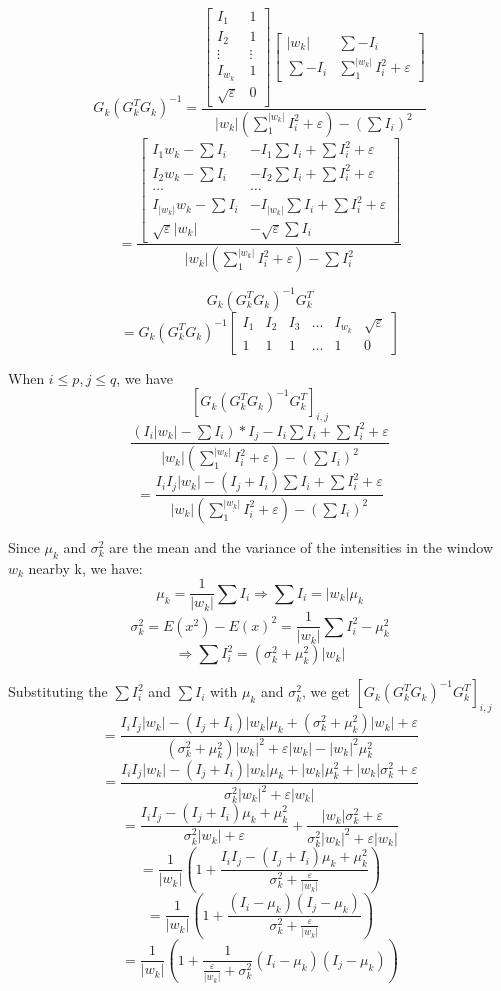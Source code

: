 \documentclass[11pt,letterpaper]{article}
\begin{document}
$$G_k(G_k^TG_k)^{-1} = \frac{\begin{bmatrix}
    I_1 & 1 \\ I_2 & 1 \\ \vdots & \vdots \\ I_{w_k} & 1 \\ \sqrt{\varepsilon} & 0 
  \end{bmatrix} 
  \begin{bmatrix}
    |w_k| & \sum -I_i \\
    \sum -I_i & \sum_{1}^{|w_k|} I_i^2 + \varepsilon
  \end{bmatrix}}{|w_k|(\sum_{1}^{|w_k|} I_i^2 + \varepsilon) - (\sum I_i)^2} $$
$$ = \frac{\begin{bmatrix}
    I_1w_k - \sum I_i & -I_1 \sum I_i + \sum I_i^2 + \varepsilon \\
    I_2w_k - \sum I_i & -I_2 \sum I_i + \sum I_i^2 + \varepsilon \\
    \hdots & \hdots \\
    I_{|w_k|}w_k - \sum I_i & -I_{|w_k|} \sum I_i + \sum I_i^2 + \varepsilon \\
    \sqrt{\varepsilon}|w_k| & -\sqrt{\varepsilon}\sum I_i
  \end{bmatrix}}{|w_k|(\sum_{1}^{|w_k|} I_i^2 + \varepsilon) - \sum I_i^2}$$

$$G_k(G_k^TG_k)^{-1}G_k^T $$
$$= G_k(G_k^TG_k)^{-1}
  \begin{bmatrix}
    I_1 & I_2 & I_3 & ... & I_{w_k} & \sqrt{\varepsilon}\\
    1 & 1 & 1 & ... & 1 & 0 
  \end{bmatrix} $$

When $i \le p, j \le q$, we have 
$$[G_k(G_k^TG_k)^{-1}G_k^T]_{i, j} $$
$$ \frac{(I_i |w_k| - \sum I_i) * I_j - I_i \sum I_i + \sum I_i^2 + \varepsilon}{|w_k|(\sum_{1}^{|w_k|} I_i^2 + \varepsilon) - (\sum I_i)^2}$$
$$= \frac{I_i I_j |w_k| - (I_j + I_i)\sum I_i + \sum I_i^2 + \varepsilon}{|w_k|(\sum_{1}^{|w_k|} I_i^2 + \varepsilon) - (\sum I_i)^2}$$

Since $\mu_k$ and $\sigma_k^2$ are the mean and the variance of the intensities in the window $w_k$  nearby k, we have:
$$\mu_k = \frac{1}{|w_k|}\sum I_i \Rightarrow \sum I_i = |w_k|\mu_k$$
$$\sigma_k^2 = E(x^2) - E(x)^2 = \frac{1}{|w_k|}\sum I_i^2 - \mu_k^2 $$
$$\Rightarrow \sum I_i^2 = (\sigma_k^2 + \mu_k^2)|w_k|$$

Substituting the $\sum I_i^2$ and $\sum I_i$ with $\mu_k$ and $\sigma_k^2$, we get
$[G_k(G_k^TG_k)^{-1}G_k^T]_{i, j}$
$$= \frac{I_i I_j |w_k| - (I_j + I_i)|w_k|\mu_k + (\sigma_k^2 + \mu_k^2)|w_k| + \varepsilon}{(\sigma_k^2 + \mu_k^2)|w_k|^2 + \varepsilon|w_k| - |w_k|^2\mu_k^2} $$
$$ = \frac{I_i I_j |w_k| - (I_j + I_i)|w_k|\mu_k + |w_k|\mu_k^2 + |w_k|\sigma_k^2 + \varepsilon}{\sigma_k^2|w_k|^2 + \varepsilon|w_k|}$$
$$ = \frac{I_i I_j - (I_j + I_i)\mu_k + \mu_k^2}{\sigma_k^2|w_k| + \varepsilon} + 
\frac{|w_k|\sigma_k^2 + \varepsilon}{\sigma_k^2|w_k|^2 + \varepsilon|w_k|}$$
$$ = \frac{1}{|w_k|}(1 + \frac{I_i I_j - (I_j + I_i)\mu_k + \mu_k^2}{\sigma_k^2 + \frac{\varepsilon}{|w_k|}})$$
$$= \frac{1}{|w_k|}(1 + \frac{(I_i - \mu_k)(I_j - \mu_k)}{\sigma_k^2 + \frac{\varepsilon}{|w_k|}})$$
$$= \frac{1}{|w_k|}(1 + \frac{1}{\frac{\varepsilon}{|w_k|} + \sigma_k^2}(I_i - \mu_k)(I_j - \mu_k))$$
\end{document}
